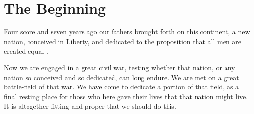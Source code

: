 
\section{The Beginning}
 
Four score and seven years ago our fathers brought forth on this continent, a new nation, conceived in Liberty, and dedicated to the proposition that all men are created equal \cite{theinternet}.

Now we are engaged in a great civil war, testing whether that nation, or any nation so conceived and so dedicated, can long endure. We are met on a great battle-field of that war. We have come to dedicate a portion of that field, as a final resting place for those who here gave their lives that that nation might live. It is altogether fitting and proper that we should do this. 


